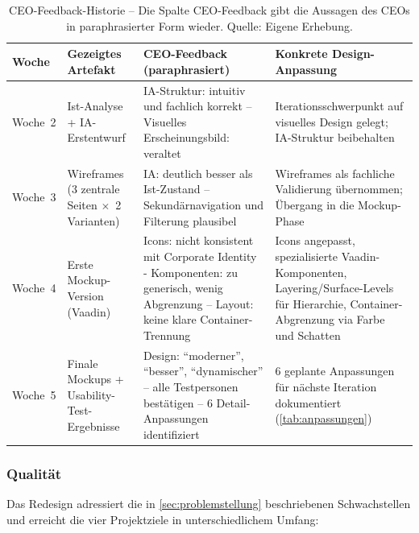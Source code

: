 \begin{table}[H]
    \centering
    \scriptsize
    \begin{tabular}{@{}p{1.5cm}p{3.5cm}p{4cm}p{3.5cm}@{}}
        \toprule
        \textbf{Woche} & \textbf{Gezeigtes Artefakt} & \textbf{CEO-Feedback (paraphrasiert)} & \textbf{Konkrete Design-Anpassung} \\
        \midrule
                Woche~2 & Ist-Analyse + IA-Erstentwurf & IA-Struktur: intuitiv und fachlich korrekt -- Visuelles Erscheinungsbild: veraltet & Iterationsschwerpunkt auf visuelles Design gelegt; IA-Struktur beibehalten \\
                Woche~3 & Wireframes (3 zentrale Seiten $\times$~2 Varianten) & IA: deutlich besser als Ist-Zustand -- Sekundärnavigation und Filterung plausibel & Wireframes als fachliche Validierung übernommen; Übergang in die Mockup-Phase \\
                Woche~4 & Erste Mockup-Version (Vaadin) & Icons: nicht konsistent mit Corporate Identity - Komponenten: zu generisch, wenig Abgrenzung -- Layout: keine klare Container-Trennung & Icons angepasst, spezialisierte Vaadin-Komponenten, Layering/Surface-Levels für Hierarchie, Container-Abgrenzung via Farbe und Schatten \\
                Woche~5 & Finale Mockups + Usability-Test-Ergebnisse & Design: \enquote{moderner}, \enquote{besser}, \enquote{dynamischer} -- alle Testpersonen bestätigen -- 6 Detail-Anpassungen identifiziert & 6 geplante Anpassungen für nächste Iteration dokumentiert (\autoref{tab:anpassungen}) \\
        \bottomrule
    \end{tabular}
    \caption[CEO-Feedback-Historie]{CEO-Feedback-Historie -- Die Spalte \glqq CEO-Feedback\grqq{} gibt die Aussagen des CEOs in paraphrasierter Form wieder. Quelle: Eigene Erhebung.}
    \label{tab:ceo_feedback_historie}
\end{table}

\subsubsection{Qualität}

Das Redesign adressiert die in \autoref{sec:problemstellung} beschriebenen Schwachstellen und erreicht die vier Projektziele in unterschiedlichem Umfang:

